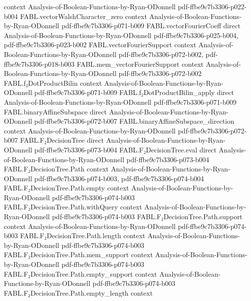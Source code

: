 \begin{theorem}
  {context}
  {Analysis-of-Boolean-Functions-by-Ryan-ODonnell}
  {pdf-ffbe9c7b3306-p022-b004}
\proofstep
  {FABL.vectorWalshCharacter_zero}
  {context}
  {Analysis-of-Boolean-Functions-by-Ryan-ODonnell}
  {pdf-ffbe9c7b3306-p071-b009}
\proofstep
  {FABL.vectorFourierCoeff}
  {direct}
  {Analysis-of-Boolean-Functions-by-Ryan-ODonnell}
  {pdf-ffbe9c7b3306-p025-b004,
    pdf-ffbe9c7b3306-p023-b002}
\proofstep
  {FABL.vectorFourierSupport}
  {context}
  {Analysis-of-Boolean-Functions-by-Ryan-ODonnell}
  {pdf-ffbe9c7b3306-p072-b002,
    pdf-ffbe9c7b3306-p018-b003}
\proofstep
  {FABL.mem_vectorFourierSupport}
  {context}
  {Analysis-of-Boolean-Functions-by-Ryan-ODonnell}
  {pdf-ffbe9c7b3306-p072-b002}
\proofstep
  {FABL.f₂DotProductBilin}
  {context}
  {Analysis-of-Boolean-Functions-by-Ryan-ODonnell}
  {pdf-ffbe9c7b3306-p071-b009}
\proofstep
  {FABL.f₂DotProductBilin_apply}
  {direct}
  {Analysis-of-Boolean-Functions-by-Ryan-ODonnell}
  {pdf-ffbe9c7b3306-p071-b009}
\proofstep
  {FABL.binaryAffineSubspace}
  {direct}
  {Analysis-of-Boolean-Functions-by-Ryan-ODonnell}
  {pdf-ffbe9c7b3306-p072-b007}
\proofstep
  {FABL.binaryAffineSubspace_direction}
  {context}
  {Analysis-of-Boolean-Functions-by-Ryan-ODonnell}
  {pdf-ffbe9c7b3306-p072-b007}
\proofstep
  {FABL.F₂DecisionTree}
  {direct}
  {Analysis-of-Boolean-Functions-by-Ryan-ODonnell}
  {pdf-ffbe9c7b3306-p073-b004}
\proofstep
  {FABL.F₂DecisionTree.eval}
  {direct}
  {Analysis-of-Boolean-Functions-by-Ryan-ODonnell}
  {pdf-ffbe9c7b3306-p073-b004}
\proofstep
  {FABL.F₂DecisionTree.Path}
  {context}
  {Analysis-of-Boolean-Functions-by-Ryan-ODonnell}
  {pdf-ffbe9c7b3306-p074-b003,
    pdf-ffbe9c7b3306-p074-b004}
\proofstep
  {FABL.F₂DecisionTree.Path.empty}
  {context}
  {Analysis-of-Boolean-Functions-by-Ryan-ODonnell}
  {pdf-ffbe9c7b3306-p074-b003}
\proofstep
  {FABL.F₂DecisionTree.Path.withQuery}
  {context}
  {Analysis-of-Boolean-Functions-by-Ryan-ODonnell}
  {pdf-ffbe9c7b3306-p074-b003}
\proofstep
  {FABL.F₂DecisionTree.Path.support}
  {context}
  {Analysis-of-Boolean-Functions-by-Ryan-ODonnell}
  {pdf-ffbe9c7b3306-p074-b003}
\proofstep
  {FABL.F₂DecisionTree.Path.length}
  {context}
  {Analysis-of-Boolean-Functions-by-Ryan-ODonnell}
  {pdf-ffbe9c7b3306-p074-b003}
\proofstep
  {FABL.F₂DecisionTree.Path.mem_support}
  {context}
  {Analysis-of-Boolean-Functions-by-Ryan-ODonnell}
  {pdf-ffbe9c7b3306-p074-b003}
\proofstep
  {FABL.F₂DecisionTree.Path.empty_support}
  {context}
  {Analysis-of-Boolean-Functions-by-Ryan-ODonnell}
  {pdf-ffbe9c7b3306-p074-b003}
\proofstep
  {FABL.F₂DecisionTree.Path.empty_length}
  {context}

\end{theorem}
